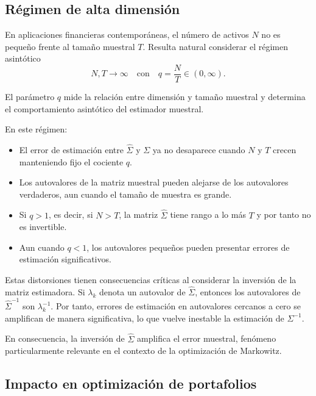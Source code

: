 \documentclass[letterpaper,12pt,oneside]{book}
\begin{document}
\subsection*{Régimen de alta dimensión}

En aplicaciones financieras contemporáneas, el número de activos $N$ 
no es pequeño frente al tamaño muestral $T$. Resulta natural considerar 
el régimen asintótico
\[
N, T \to \infty 
\quad \text{con} \quad 
q = \frac{N}{T} \in (0,\infty).
\]

El parámetro $q$ mide la relación entre dimensión y tamaño muestral y determina el comportamiento asintótico del estimador muestral.

En este régimen:

\begin{itemize}
    \item El error de estimación entre $\widehat{\Sigma}$ y $\Sigma$ 
    ya no desaparece cuando $N$ y $T$ crecen manteniendo fijo el cociente $q$.
    
    \item Los autovalores de la matriz muestral pueden alejarse de los 
    autovalores verdaderos, aun cuando el tamaño de muestra es grande.
    
    \item Si $q > 1$, es decir, si $N > T$, la matriz $\widehat{\Sigma}$ 
    tiene rango a lo más $T$ y por tanto no es invertible.
    
    \item Aun cuando $q < 1$, los autovalores pequeños pueden presentar errores de estimación significativos.
\end{itemize}

Estas distorsiones tienen consecuencias críticas al considerar la inversión de la matriz estimadora. Si $\lambda_k$ denota un autovalor de $\widehat{\Sigma}$, entonces los autovalores de $\widehat{\Sigma}^{-1}$ son $\lambda_k^{-1}$. Por tanto, errores de estimación en autovalores cercanos a cero se amplifican de manera significativa, lo que vuelve inestable la estimación de $\Sigma^{-1}$.

En consecuencia, la inversión de $\widehat{\Sigma}$ amplifica el error muestral, fenómeno particularmente relevante en el contexto de la optimización de Markowitz.

\subsection*{Impacto en optimización de portafolios}
\end{document}

